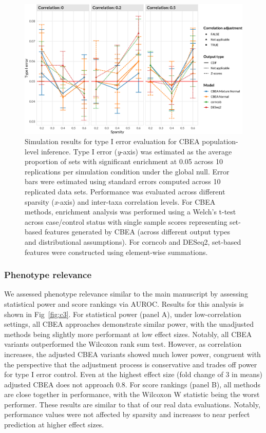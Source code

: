 \begin{figure}[!h]
    \centering
    \includegraphics[width=\linewidth]{figures/appC_fs2.eps}
    \caption[Simulation results for type I error evaluation for CBEA population-level inference]{Simulation results for type I error evaluation for CBEA population-level inference. Type I error (\emph{y}-axis) was estimated as the average proportion of sets with significant enrichment at 0.05 across 10 replications per simulation condition under the global null. Error bars were estimated using standard errors computed across 10 replicated data sets. Performance was evaluated across different sparsity (\emph{x}-axis) and inter-taxa correlation levels. For CBEA methods, enrichment analysis was performed using a Welch's t-test across case/control status with single sample scores representing set-based features generated by CBEA (across different output types and distributional assumptions). For corncob and DESeq2, set-based features were constructed using element-wise summations.}
    \label{fig:c2}
\end{figure}

\subsubsection{Phenotype relevance}

We assessed phenotype relevance similar to the main manuscript by assessing statistical power and score rankings via AUROC. Results for this analysis is shown in Fig~\ref{fig:c3}. For statistical power (panel A), under low-correlation settings, all CBEA approaches demonstrate similar power, with the unadjusted methods being slightly more performant at low effect sizes. Notably, all CBEA variants outperformed the Wilcoxon rank sum test. However, as correlation increases, the adjusted CBEA variants showed much lower power, congruent with the perspective that the adjustment process is conservative and trades off power for type I error control. Even at the highest effect size (fold change of 3 in means) adjusted CBEA does not approach 0.8. For score rankings (panel B), all methods are close together in performance, with the Wilcoxon W statistic being the worst performer. These results are similar to that of our real data evaluations. Notably, performance values were not affected by sparsity and increases to near perfect prediction at higher effect sizes.  

